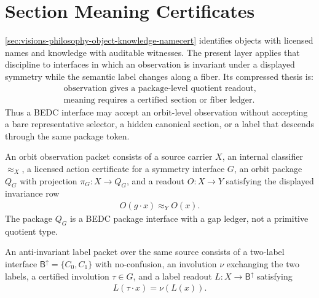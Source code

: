 \section{Section Meaning Certificates}
\label{sec:visions-philosophy-section-meaning-certificate}

\autoref{sec:visions-philosophy-object-knowledge-namecert}
identifies objects with licensed names and knowledge with auditable
witnesses. The present layer applies that discipline to interfaces in
which an observation is invariant under a displayed symmetry while the
semantic label changes along a fiber. Its compressed thesis is:
$$
\begin{gathered}
\text{observation gives a package-level quotient readout},\\
\text{meaning requires a certified section or fiber ledger}.
\end{gathered}
$$
Thus a BEDC interface may accept an orbit-level observation without
accepting a bare representative selector, a hidden canonical section,
or a label that descends through the same package token.

\begin{definition}
\label{def:philosophy-orbit-observation-packet}
An orbit observation packet consists of a source carrier $X$, an
internal classifier $\approx_X$, a licensed action certificate for a
symmetry interface $G$, an orbit package $Q_G$ with projection
$\pi_G:X\to Q_G$, and a readout $O:X\to Y$ satisfying the displayed
invariance row
$$
\begin{gathered}
O(g\cdot x)\approx_Y O(x).
\end{gathered}
$$
The package $Q_G$ is a BEDC package interface with a gap ledger, not a
primitive quotient type.
\end{definition}

\begin{definition}
\label{def:philosophy-anti-invariant-label-packet}
An anti-invariant label packet over the same source consists of a
two-label interface $\mathsf{B}^{\uparrow}=\{C_0,C_1\}$ with
no-confusion, an involution $\nu$ exchanging the two labels, a certified
involution $\tau\in G$, and a label readout
$L:X\to\mathsf{B}^{\uparrow}$ satisfying
$$
\begin{gathered}
L(\tau\cdot x)=\nu(L(x)).
\end{gathered}
$$
\end{definition}


